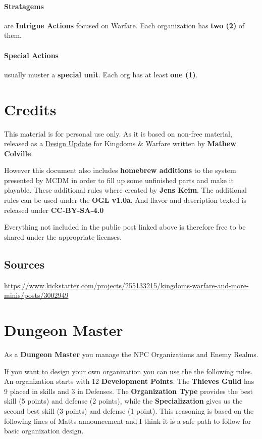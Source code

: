 \documentclass[letterpaper,twocolumn,openany,nodeprecatedcode]{dndbook}
\begin{document}
\paragraph{Stratagems} are \textbf{Intrigue Actions} focused on Warfare.
Each organization has \textbf{two (2)} of them.

\paragraph{Special Actions} usually muster a \textbf{special unit}.
Each org has at least \textbf{one (1)}.

\pagebreak

\section{Credits}

This material is for personal use only.
As it is based on non-free material, released as a \href{https://www.kickstarter.com/projects/255133215/kingdoms-warfare-and-more-minis/posts/3002949}{Design Update} for Kingdoms \& Warfare written by \textbf{Mathew Colville}.

However this document also includes \textbf{homebrew additions} to the system presented by MCDM in order to fill up some unfinished parts and make it playable.
These additional rules where created by \textbf{Jens Keim}.
The additional rules can be used under the \textbf{OGL v1.0a}.
And flavor and description texted is released under \textbf{CC-BY-SA-4.0}

Everything not included in the public post linked above is therefore free to be shared under the appropriate licenses.

\subsection{Sources}

\url{https://www.kickstarter.com/projects/255133215/kingdoms-warfare-and-more-minis/posts/3002949}

\section{Dungeon Master}

As a \textbf{Dungeon Master} you manage the NPC Organizations and Enemy Realms.

If you want to design your own organization you can use the the following rules. %
An organization starts with 12 \textbf{Development Points}.
The \textbf{Thieves Guild} has 9 placed in skills and 3 in Defenses.
The \textbf{Organization Type} provides the best skill (5 points) and defense (2 points), while the \textbf{Specialization} gives us the second best skill (3 points) and defense (1 point).
This reasoning is based on the following lines of Matts announcement and I think it is a safe path to follow for basic organization design.
\end{document}

